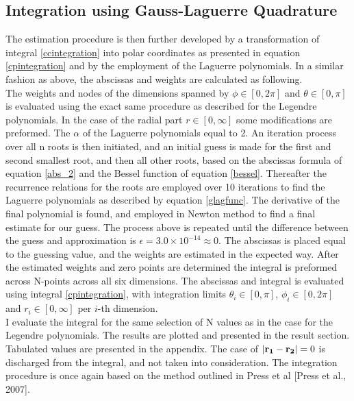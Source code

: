 \documentclass[%
reprint,
amsmath,amssymb,
aps,
]{revtex4-1}
\begin{document}
\subsection{Integration using Gauss-Laguerre Quadrature} \noindent 
The estimation procedure is then further developed by a transformation of integral \ref{ccintegration} into polar coordinates as presented in equation \ref{cpintegration} and by the employment of the Laguerre polynomials. In a similar fashion as above, the abscissas and weights are calculated as following. \\ \indent 
The weights and nodes of the dimensions spanned by $\phi\in [0,2\pi]$ and $\theta\in[0,\pi]$ is evaluated using the exact same procedure as described for the Legendre polynomials. In the case of the radial part $r\in[0,\infty]$ some modifications are preformed. The $\alpha$ of the Laguerre polynomials equal to 2. An iteration process over all n roots is then initiated, and an initial guess is made for the first and second smallest root, and then all other roots, based on the abscissas formula of equation \ref{abs_2} and the Bessel function of equation \ref{bessel}. Thereafter the recurrence relations for the roots are employed over 10 iterations  to find the Laguerre polynomials as described by equation \ref{glagfunc}. The derivative of the final polynomial is found, and employed in Newton method to find a final estimate for our guess. The process above is repeated until the difference between the guess and approximation is $\epsilon = 3.0\times 10^{-14} \approx 0$. The abscissas is placed equal to the guessing value, and the weights are estimated in the expected way. After the estimated weights and zero points are determined the integral is preformed across N-points across all six dimensions. The abscissas and integral is evaluated using integral \ref{cpintegration}, with integration limits $\theta_i \in [0,\pi]$, $\phi_i \in [0,2\pi]$ and $r_i\in[0,\infty]$ per $i$-th dimension. \\ \indent I evaluate the integral for the same selection of N values as in the case for the Legendre polynomials. The results are plotted and presented in the result section. Tabulated values are presented in the appendix. The case of  $\abs{\mathbf{r_1} -\mathbf{r_2}} = 0$ is discharged from the integral, and not taken into consideration. The integration procedure is once again based on the method outlined in Press et al [Press et al., 2007].\\
\end{document}
